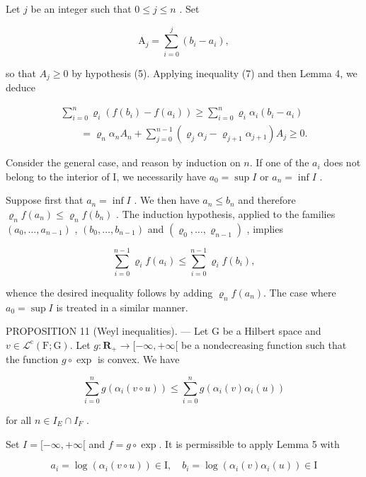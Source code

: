 Let \(j\) be an integer such that \(0 \leqslant j \leqslant n\) . Set

\[
\mathrm{A} _ {j} = \sum_ {i = 0} ^ {j} (b _ {i} - a _ {i}),
\]

so that \(A_{j} \geqslant 0\) by hypothesis (5). Applying inequality (7) and then Lemma 4, we deduce

\[
\begin{array}{l} \sum_ {i = 0} ^ {n} \varrho_ {i} (f (b _ {i}) - f (a _ {i})) \geqslant \sum_ {i = 0} ^ {n} \varrho_ {i} \alpha_ {i} (b _ {i} - a _ {i}) \\ \qquad = \varrho_ {n} \alpha_ {n} A _ {n} + \sum_ {j = 0} ^ {n - 1} (\varrho_ {j} \alpha_ {j} - \varrho_ {j + 1} \alpha_ {j + 1}) A _ {j} \geqslant 0. \end{array}
\]

Consider the general case, and reason by induction on \(n\). If one of the \(a_{i}\) does not belong to the interior of I, we necessarily have \(a_{0} = \sup I\) or \(a_{n} = \inf I\) .

Suppose first that \(a_{n}=\inf I\) . We then have \(a_{n}\leqslant b_{n}\) and therefore \(\varrho_{n}f(a_{n})\leqslant\varrho_{n}f(b_{n})\) . The induction hypothesis, applied to the families \((a_{0},\ldots,a_{n-1})\) , \((b_{0},\ldots,b_{n-1})\) and \((\varrho_{0},\ldots,\varrho_{n-1})\) , implies

\[
\sum_ {i = 0} ^ {n - 1} \varrho_ {i} f (a _ {i}) \leqslant \sum_ {i = 0} ^ {n - 1} \varrho_ {i} f (b _ {i}),
\]

whence the desired inequality follows by adding \(\varrho_{n}f(a_{n})\). The case where \(a_{0} = \sup I\) is treated in a similar manner.

PROPOSITION 11 (Weyl inequalities). --- Let G be a Hilbert space and \(v \in \mathcal{L}^{\mathrm{c}}(\mathrm{F};\mathrm{G})\). Let \(g: \mathbf{R}_{+} \to [-\infty, +\infty[\) be a nondecreasing function such that the function \(g \circ \exp\) is convex. We have

\[
\sum_ {i = 0} ^ {n} g \left(\alpha_ {i} (v \circ u)\right) \leqslant \sum_ {i = 0} ^ {n} g \left(\alpha_ {i} (v) \alpha_ {i} (u)\right)
\]

for all \(n \in I_{E} \cap I_{F}\) .

Set \(I = [-\infty, +\infty[\) and \(f = g \circ \exp\). It is permissible to apply Lemma 5 with

\[
a _ {i} = \log (\alpha_ {i} (v \circ u)) \in \mathrm{I}, \quad b _ {i} = \log (\alpha_ {i} (v) \alpha_ {i} (u)) \in \mathrm{I}
\]

